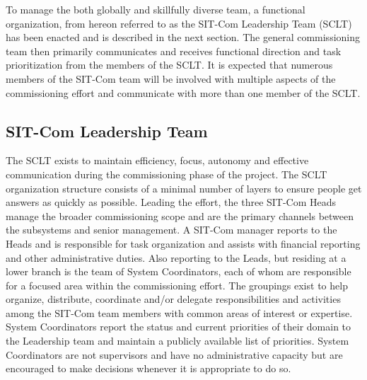 \documentclass[SE,lsstdraft,authoryear,toc]{lsstdoc}
\begin{document}
To manage the both globally and skillfully diverse team, a functional organization, from hereon referred to as the SIT-Com Leadership Team (SCLT) has been enacted and is described in the next section.
The general commissioning team then primarily communicates and receives functional direction and task prioritization from the members of the SCLT.
It is expected that numerous members of the SIT-Com team will be involved with multiple aspects of the commissioning effort and communicate with more than one member of the SCLT.
%



\subsection{SIT-Com Leadership Team}
\label{sec:SCLT}

The SCLT exists to maintain efficiency, focus, autonomy and effective communication during the commissioning phase of the project.
The SCLT organization structure consists of a minimal number of layers to ensure people get answers as quickly as possible.
Leading the effort, the three SIT-Com Heads manage the broader commissioning scope and are the primary channels between the subsystems and senior management.
A SIT-Com manager reports to the Heads and is responsible for task organization and assists with financial reporting and other administrative duties.
Also reporting to the Leads, but residing at a lower branch is the team of System Coordinators, each of whom are responsible for a focused area within the commissioning effort.
The groupings exist to help organize, distribute, coordinate and/or delegate responsibilities and activities among the SIT-Com team members with common areas of interest or expertise.
System Coordinators report the status and current priorities of their domain to the Leadership team and maintain a publicly available list of priorities.
System Coordinators are not supervisors and have no administrative capacity but are encouraged to make decisions whenever it is appropriate to do so.
\end{document}
